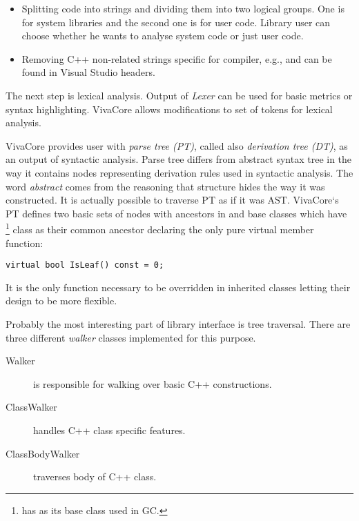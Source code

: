 \begin{itemize}
\item Splitting code into strings and dividing them into two logical groups. One is for system libraries and the second one is for user code. Library user can choose whether he wants to analyse system code or just user code.
\item Removing C++ non-related strings specific for compiler, e.g.,  and  can be found in Visual Studio headers.
\end{itemize}

The next step is lexical analysis. Output of \emph{Lexer} can be used for basic metrics or syntax highlighting. VivaCore allows modifications to set of tokens for lexical analysis.

VivaCore provides user with \emph{parse tree (PT)}, called also \emph{derivation tree (DT)}, as an output of syntactic analysis. Parse tree differs from abstract syntax tree in the way it contains nodes representing derivation rules used in syntactic analysis. The word \emph{abstract} comes from the reasoning that structure hides the way it was constructed. It is actually possible to traverse PT as if it was AST. VivaCore`s PT defines two basic sets of nodes with ancestors in  and  base classes which have \footnote{ has  as its base class used in GC.} class as their common ancestor declaring the only pure virtual member function:

\begin{lstlisting}[caption={Pure virtual member function of base for VivaCore parse tree node.}]
virtual bool IsLeaf() const = 0;
\end{lstlisting}

It is the only function necessary to be overridden in inherited classes letting their design to be more flexible.

Probably the most interesting part of library interface is tree traversal. There are three different \emph{walker} classes implemented for this purpose.

\begin{description}
\item[Walker] is responsible for walking over basic C++ constructions.
\item[ClassWalker] handles C++ class specific features.
\item[ClassBodyWalker] traverses body of C++ class.
\end{description}

